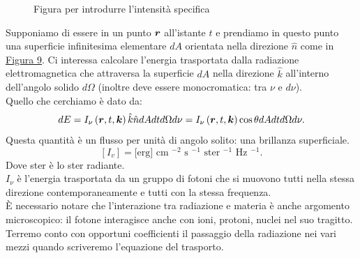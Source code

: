 \begin{figure}[H]
    \centering
    \caption{Figura per introdurre l'intensità specifica}
    \label{fig:figura-per-introdurre-lintensit-specifica}
\end{figure}
\noindent
Supponiamo di essere in un punto $\boldsymbol{r}$ all'istante $t$ e prendiamo in questo punto una superficie infinitesima elementare $dA$ orientata nella direzione $\hat{n}$ come in \hyperref[fig:figura-per-introdurre-lintensit-specifica]{Figura 9}. Ci interessa calcolare l'energia trasportata dalla radiazione elettromagnetica che attraversa la superficie $dA$ nella direzione $\hat{k}$ all'interno dell'angolo solido $d\Omega$ (inoltre deve essere monocromatica: tra $\nu$ e $d\nu$).\\
Quello che cerchiamo è dato da:
\[
	dE = I_{\nu}\left( \boldsymbol{r}, t,\boldsymbol{k} \right) \hat{k}\hat{n} dAdtd\Omega d\nu
	= I_{\nu}\left( \boldsymbol{r},t, \boldsymbol{k} \right) \cos\theta dA dt d\Omega d\nu
.\] 
Questa quantità è un flusso per unità di angolo solito: una brillanza superficiale. 
\[
	[I_{v}] = \text{[erg] cm $^{-2}$ s $^{-1}$ ster $^{-1}$ Hz $^{-1}$} 
.\] 
Dove ster è lo ster radiante.\\
$I_{\nu}$ è l'energia trasportata da un gruppo di fotoni che si muovono tutti nella stessa direzione contemporaneamente e tutti con la stessa frequenza.\\
È necessario notare che l'interazione tra radiazione e materia è anche argomento microscopico: il fotone interagisce anche con ioni, protoni, nuclei nel suo tragitto. Terremo conto con opportuni coefficienti il passaggio della radiazione nei vari mezzi quando scriveremo l'equazione del trasporto.\\
